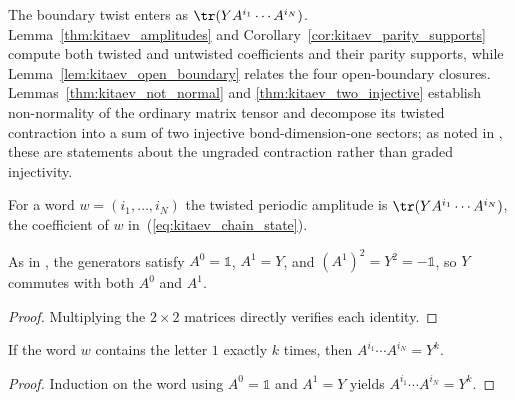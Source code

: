 The boundary twist enters as $\tr(YA^{i_1}\cdots A^{i_N})$.
Lemma~\ref{thm:kitaev_amplitudes} and
Corollary~\ref{cor:kitaev_parity_supports} compute both twisted and
untwisted coefficients and their parity supports, while
Lemma~\ref{lem:kitaev_open_boundary} relates the four open-boundary closures.
Lemmas~\ref{thm:kitaev_not_normal} and \ref{thm:kitaev_two_injective}
establish non-normality of the ordinary matrix tensor and decompose its
twisted contraction into a sum of two injective bond-dimension-one sectors;
as noted in \cite{gap:rmp_kitaev_chain_bosonic_scope}, these are statements
about the ungraded contraction rather than graded injectivity.


\begin{definition}\label{def:kitaev_twisted_coeff}
    \leanok
    For a word $w=(i_1,\ldots,i_N)$ the twisted periodic amplitude is
    $\tr(YA^{i_1}\cdots A^{i_N})$, the coefficient of $w$
    in~(\ref{eq:kitaev_chain_state}).
\end{definition}

\begin{lemma}\label{lem:kitaev_twist_sq}
    \leanok
    As in \cite{Bultinck2017FermionicMPS}, the generators satisfy
    $A^0=\mathbb 1$, $A^1=Y$, and $(A^1)^2=Y^2=-\mathbb 1$, so $Y$ commutes
    with both $A^0$ and $A^1$.
\end{lemma}

\begin{proof}
    \leanok
    Multiplying the $2\times2$ matrices directly verifies each identity.
\end{proof}

\begin{lemma}\label{lem:kitaev_eval_word}
    \leanok
    If the word $w$ contains the letter $1$ exactly $k$ times, then
    $A^{i_1}\cdots A^{i_N}=Y^k$.
\end{lemma}

\begin{proof}
    \leanok
    Induction on the word using $A^0=\mathbb 1$ and $A^1=Y$ yields
    $A^{i_1}\cdots A^{i_N}=Y^k$.
\end{proof}

